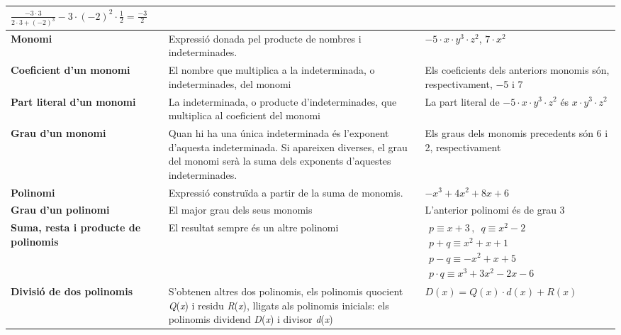 \begin{center}
\begin{longtable}{|P{0.2\textwidth}|p{0.35\textwidth}|p{0.35\textwidth}|}
		\par
		$\frac{-3\cdot 3}{2\cdot 3+(-2)^{3} } -3\cdot (-2)^{2} \cdot \frac{1}{2} =\frac{-3}{2} $ \\ \hline 
		 \textbf{Monomi} & Expressió donada pel producte de nombres i indeterminades. & $-5\cdot x\cdot y^{3} \cdot z^{2} $, $7\cdot x^{2} $ \\ \hline 
		 \textbf{Coeficient d'un monomi} & El nombre que multiplica a la indeterminada, o indeterminades, del monomi & Els coeficients dels anteriors monomis són, respectivament, $-$5 i 7 \\ \hline 
		 \textbf{Part literal d'un monomi} & La indeterminada, o producte d'indeterminades, que multiplica al coeficient del monomi & La part literal de $-5\cdot x\cdot y^{3} \cdot z^{2} $  és $x\cdot y^{3} \cdot z^{2} $  \\ \hline 
		 \textbf{Grau d'un monomi} & Quan hi ha una única indeterminada és l'exponent d'aquesta indeterminada. Si apareixen diverses, el grau del monomi serà la suma dels exponents d'aquestes indeterminades. & Els graus dels monomis precedents són 6 i 2, respectivament \\ \hline 
		 \textbf{Polinomi} & Expressió construïda a partir de la suma de monomis. & $-x^{3} +4x^{2} +8x+6$ \\ \hline 
		 \textbf{Grau d'un polinomi} & El major grau dels seus monomis & L'anterior polinomi és de grau 3 \\ \hline 
		 \textbf{Suma, resta i producte de polinomis} & El resultat sempre és un altre polinomi & $\begin{array}{l} {p\equiv x+3\, ,\, \, \, q\equiv x^{2} -2} \\ {p+q\equiv x^{2} +x+1} \\ {p-q\equiv -x^{2} +x+5} \\ {p\cdot q\equiv x^{3} +3x^{2} -2x-6} \end{array}$ \\ \hline 
		 \textbf{Divisió de dos polinomis} & S'obtenen altres dos polinomis, els polinomis quocient \textit{Q}(\textit{x}) i residu \textit{R}(\textit{x}), lligats als polinomis inicials: els polinomis dividend \textit{D}(\textit{x}) i divisor \textit{d}(\textit{x})  & \newline $D(x)=Q(x)\cdot d(x)+R(x)$ \\ \hline 
	\end{longtable}
\end{center}